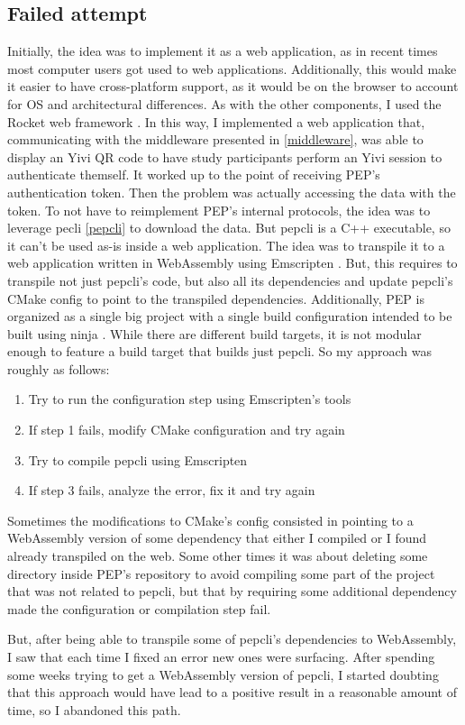 \documentclass{report}
\begin{document}
\subsection{Failed attempt}
Initially, the idea was to implement it as a web application, as in recent times most computer users got used to web applications. Additionally, this would make it easier to have
cross-platform support, as it would be on the browser to account for OS and architectural differences. As with the other components, I used the Rocket web framework \cite{rocket}.
In this way, I implemented a web application that, communicating with the middleware presented in \ref{middleware}, was able to display an Yivi QR code to have study participants
perform an Yivi session to authenticate themself. It worked up to the point of receiving PEP's authentication token. Then the problem was actually accessing the data with the
token. To not have to reimplement PEP's internal protocols, the idea was to leverage pecli \ref{pepcli} to download the data. But pepcli is a C++ executable, so it can't be used
as-is inside a web application. The idea was to transpile it to a web application written in WebAssembly using Emscripten \cite{emscripten}. But, this requires to transpile not
just pepcli's code, but also all its dependencies and update pepcli's CMake config to point to the transpiled dependencies. Additionally, PEP is organized as a single big project
with a single build configuration intended to be built using ninja . While there are different build targets, it is not modular enough
to feature a build target that builds just pepcli. So my approach was roughly as follows:

\begin{enumerate}
		\item Try to run the configuration step using Emscripten's tools
		\item If step 1 fails, modify CMake configuration and try again
		\item Try to compile pepcli using Emscripten
		\item If step 3 fails, analyze the error, fix it and try again 
\end{enumerate}

Sometimes the modifications to CMake's config consisted in pointing to a WebAssembly version of some dependency that either I compiled or I found already transpiled on the web.
Some other times it was about deleting some directory inside PEP's repository to avoid compiling some part of the project that was not related to pepcli, but that by requiring some
additional dependency made the configuration or compilation step fail. \par
But, after being able to transpile some of pepcli's dependencies to WebAssembly, I saw that each time I fixed an error new ones were surfacing. After spending some weeks trying to
get a WebAssembly version of pepcli, I started doubting that this approach would have lead to a positive result in a reasonable amount of time, so I abandoned this path.
\end{document}
